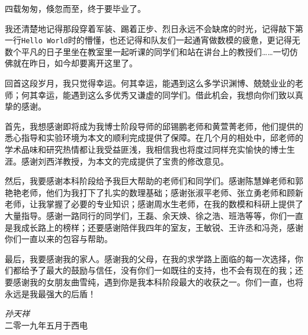 
\begin{acknowledgments}

四载匆匆，倏忽而至，终于要毕业了。

我还清楚地记得那段穿着军装、踢着正步、烈日永远不会缺席的时光，记得敲下第一行\texttt{Hello World}时的懵懂，也还记得和队友们一起通宵做数模的疲惫，更记得无数个平凡的日子里坐在教室里一起听课的同学们和站在讲台上的教授们……一切仿佛就在昨日，如今却要离开这里了。

回首这段岁月，我只觉得幸运。何其幸运，能遇到这么多学识渊博、兢兢业业的老师；何其幸运，能遇到这么多优秀又谦虚的同学们。借此机会，我想向你们致以真挚的感谢。

首先，我想感谢即将成为我博士阶段导师的邱锡鹏老师和黄萱菁老师，他们提供的悉心指导和实验环境为本文的顺利完成提供了保障。在几个月的相处中，邱老师的学术品味和研究热情都让我受益匪浅，我相信我也将度过同样充实愉快的博士生涯。感谢刘西洋教授，为本文的完成提供了宝贵的修改意见。

然后，我要感谢本科阶段给予我巨大帮助的老师们和同学们。感谢陈慧婵老师和郭艳艳老师，他们为我打下了扎实的数理基础；感谢张淑平老师、张立勇老师和顾新老师，让我掌握了必要的专业知识；感谢周水生老师，在我的数模和科研上提供了大量指导。感谢一路同行的同学们，王磊、余天焕、徐之浩、班浩等等，你们一直是我成长路上的榜样；还要感谢陪伴我四年的室友，王敏锐、王许丞和冯尧，感谢你们一直以来的包容与帮助。

最后，我要感谢我的家人。感谢我的父母，在我的求学路上面临的每一次选择，你们都给予了最大的鼓励与信任，没有你们一如既往的支持，也不会有现在的我；还要感谢我的女朋友曲雪纯，遇到你是我本科阶段最大的收获之一。你们一直，也将永远是我最强大的后盾！

\begin{flushright}
	\emph{孙天祥}\\
	二零一九年五月于西电
\end{flushright}

\end{acknowledgments}

